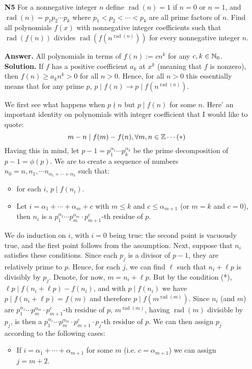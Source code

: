 \documentclass[11pt,a4paper]{article}
\begin{document}
\begin{enumerate}
	
	
	\item[\textbf{N5}] For a nonnegative integer $n$ define $\operatorname{rad}(n)=1$ if $n=0$ or $n=1$, and $\operatorname{rad}(n)=p_1p_2\cdots p_k$ where $p_1<p_2<\cdots <p_k$ are all prime factors of $n$. Find all polynomials $f(x)$ with nonnegative integer coefficients such that $\operatorname{rad}(f(n))$ divides $\operatorname{rad}(f(n^{\operatorname{rad}(n)}))$ for every nonnegative integer $n$.
	
	\textbf{Answer.} All polynomials in terms of $f(n):=cn^k$ for any $c, k\in\mathbb{N}_0$. \\
	\textbf{Solution.} If $f$ has a positive coefficient $a_k$ at $x^k$ (meaning that $f$ is nonzero), then $f(n)\ge a_kn^k>0$ for all $n>0$. Hence, for all $n>0$ this essentially means that for any prime $p$, $p\mid f(n)\to p\mid f(n^{\operatorname{rad}(n)})$. 
	
	We first see what happens when $p\nmid n$ but $p\mid f(n)$ for some $n$. Here' an important identity on polynomials with integer coefficient that I would like to quote: 
	\[m-n\mid f(m)-f(n), \forall m, n\in\mathbb{Z}\cdots (*)
	\]
	Having this in mind, let $p-1=p_1^{\alpha_1}\cdots p_k^{\alpha_k}$ be the prime decomposition of $p-1=\phi(p)$. We are to create a sequence of numbers $n_0=n, n_1, \cdots n_{\alpha_1+\cdots + \alpha_k}$ such that: 
	\begin{itemize}
		\item for each $i$, $p\mid f(n_i)$. 
		\item Let $i=\alpha_1+\cdots + \alpha_m+c$ with $m\le k$ and $c\le\alpha_{m+1}$ (or $m=k$ and $c=0$), then $n_i$ is a $p_1^{\alpha_1}\cdots p_m^{\alpha_m}\cdot p_{m+1}^{c}$-th residue of $p$. 
	\end{itemize}
	We do induction on $i$, with $i=0$ being true: the second point is vacuously true, and the first point follows from the assumption. 
	Next, suppose that $n_i$ satisfies these conditions. Since each $p_j$ is a divisor of $p-1$, they are relatively prime to $p$. Hence, for each $j$, we can find $\ell$ such that $n_i+\ell p$ is divisibly by $p_j$. Denote, for now, $m=n_i+\ell p$. But by the condition (*), $\ell p\mid f(n_i+\ell p)-f(n_i)$, and with $p\mid f(n_i)$ we have $p\mid f(n_i +\ell p)=f(m)$ and therefore $p\mid f(m^{\operatorname{rad}(m)})$. 
	Since $n_i$ (and $m$) are $p_1^{\alpha_1}\cdots p_m^{\alpha_m}\cdot p_{m+1}^{c}$-th residue of $p$, $m^{\operatorname{rad}(m)}$, having $\operatorname{rad}(m)$ divisible by $p_j$, is then a $p_1^{\alpha_1}\cdots p_m^{\alpha_m}\cdot p_{m+1}^{c}\cdot p_j$-th residue of $p$. 
	We can then assign $p_j$ according to the following cases: 
	\begin{itemize}
		\item If $i=\alpha_1+\cdots + \alpha_{m+1}$ for some $m$ (i.e. $c=\alpha_{m+1}$) we can assign $j=m+2$. 
		

\end{itemize}
\end{enumerate}
\end{document}
